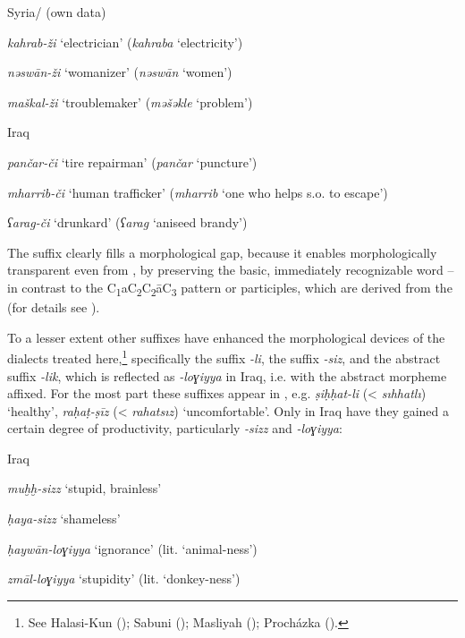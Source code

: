 \documentclass[output=paper]{langsci/langscibook}
\begin{document}
\ea\label{kahrab}
Syria/ (own data)

\textit{kahrab-ži} ‘electrician’ (\textit{kahraba} ‘electricity’)

\textit{nəswān-ži} ‘womanizer’ (\textit{nəswān} ‘women’)

\textit{maškal-ži} ‘troublemaker’ (\textit{məšəkle} ‘problem’)
\z

\ea\label{pancar}
Iraq \citep[40--44]{Procházka-Eisl2018}

\textit{pančar-či} ‘tire repairman’ (\textit{pančar} ‘puncture’)

\textit{mharrib-či} ‘human trafficker’ (\textit{mharrib} ‘one who helps s.o. to escape’)

\textit{ʕarag-či} ‘drunkard’ (\textit{ʕarag} ‘aniseed brandy’)
\z

The suffix clearly fills a morphological gap, because it enables morphologically transparent  even from , by preserving the basic, immediately recognizable word – in contrast to the  C\textsubscript{1}aC\textsubscript{2}C\textsubscript{2}āC\textsubscript{3}{} pattern or participles, which are derived from the  (for details see \citealt{Procházka-Eisl2018}).

To a lesser extent other  suffixes have enhanced the morphological devices of the dialects treated here,\footnote{See Halasi-Kun (\citeyear[68--71]{Halasi-Kun1969}); Sabuni (\citeyear[168]{Sabuni1980}); Masliyah (\citeyear{Masliyah1996}); Procházka (\citeyear[186]{Procházka2002Cukurova}).} specifically the  suffix \textit{-li}, the  suffix \textit{-siz}, and the abstract suffix \textit{-lik}, which is reflected as \textit{-loɣiyya} in Iraq, i.e. with the  abstract morpheme affixed. For the most part these suffixes appear in  , e.g.  \textit{ṣiḥḥat-li} (<  \textit{sıhhatlı}) ‘healthy’, \textit{raḥaṭ-ṣīz} (<  \textit{rahatsız}) ‘uncomfortable’. Only in Iraq have they gained a certain degree of productivity, particularly \textit{-sizz} and \textit{-loɣiyya}:

\ea
Iraq \citep[293--294]{Masliyah1996} 

\textit{muḫḫ-sizz} ‘stupid, brainless’

\textit{ḥaya-sizz} ‘shameless’

\textit{ḥaywān-loɣiyya} ‘ignorance’ (lit. ‘animal-ness’)

\textit{zmāl-loɣiyya} ‘stupidity’ (lit. ‘donkey-ness’)
\z
\end{document}
